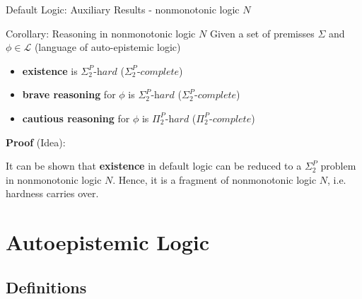 \documentclass[usenames,dvipsnames, 8pt]{beamer}
\begin{document}
\begin{frame}{Default Logic: Auxiliary Results - nonmonotonic logic $N$}
\begin{block}{Corollary: Reasoning in nonmonotonic logic $N$}
Given a set of premisses $\Sigma$ and $\phi \in \mathcal{L}$ (language of auto-epistemic logic) 
\begin{itemize}[label = {$\bullet$}]
\item \textbf{existence} is $\Sigma_2^P\textit{-hard}$ ($\Sigma_2^P\textit{-complete}$)
\item \textbf{brave reasoning} for $\phi$ is $\Sigma_2^P\textit{-hard}$ ($\Sigma_2^P\textit{-complete}$)
\item \textbf{cautious reasoning} for $\phi$ is $\Pi_2^P\textit{-hard}$ ($\Pi_2^P\textit{-complete}$)
\end{itemize}
\end{block}

\textbf{Proof} (Idea):

It can be shown that \textbf{existence} in default logic can be reduced to a $\Sigma_2^P$ problem in nonmonotonic logic $N$. Hence, it is a fragment of nonmonotonic logic $N$, i.e. hardness carries over.
\end{frame}


\section{Autoepistemic Logic}
\subsection{Definitions}
\end{document}
